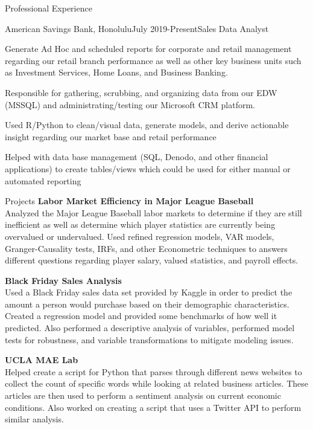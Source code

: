 \documentclass{resume} %
\begin{document}
\begin{rSection}{Professional Experience}
\begin{rSubsection}{American Savings Bank, Honolulu}{July 2019-Present}{Sales Data Analyst}{}
\item Generate Ad Hoc and scheduled reports for corporate and retail management regarding our retail branch performance as well as other key business units such as Investment Services, Home Loans, and Business Banking.
\item Responsible for gathering, scrubbing, and organizing data from our EDW (MSSQL) and administrating/testing our Microsoft CRM platform.
\item Used R/Python to clean/visual data, generate models, and derive actionable insight regarding our market base and retail performance
\item Helped with data base management (SQL, Denodo, and other financial applications) to create tables/views which could be used for either manual or automated reporting
\end{rSubsection}
\end{rSection}
\begin{rSection}{Projects}
{\bf Labor Market Efficiency in Major League Baseball}\\
Analyzed the Major League Baseball labor markets to determine if they are still inefficient as well as determine which player statistics are currently being overvalued or undervalued. Used refined regression models, VAR models, Granger-Causality tests, IRFs, and other Econometric techniques  to answers different questions regarding player salary, valued statistics, and payroll effects. 

{\bf Black Friday Sales Analysis}\\
 Used a Black Friday sales data set provided by Kaggle in order to predict the amount a person would purchase based on their demographic characteristics. Created a regression model and provided some benchmarks of how well it predicted. Also performed a descriptive analysis of variables, performed model tests for robustness, and variable transformations to mitigate modeling issues. 

{\bf UCLA MAE Lab}\\
 Helped create a script for Python that parses through different news websites to collect the count of specific words while looking at related business articles. These articles are then used to perform a sentiment analysis on current economic conditions. Also worked on creating a script that uses a Twitter API to perform similar analysis.

\end{rSection}
\end{document}

